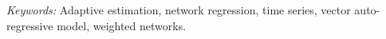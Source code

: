 \documentclass[12pt]{article}
\begin{document}
\begin{abstract}
\end{abstract}

\noindent
{\it Keywords:} Adaptive estimation, network regression, time series, vector auto-regressive model, weighted networks.
\vfill


\newpage
{}
\setlength{\abovedisplayskip}{2pt}
\setlength{\belowdisplayskip}{2pt}











%



%
%
\end{document}

